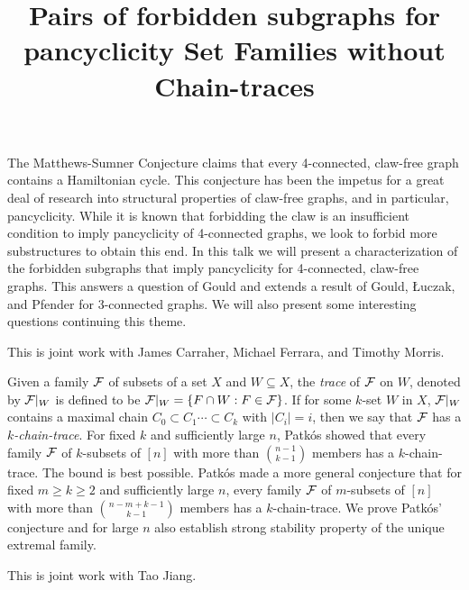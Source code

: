 \documentclass{article}
\def\cF{{\cal F}}
\begin{document}
\title{  Pairs of forbidden subgraphs for pancyclicity}
\endtitle
The Matthews-Sumner Conjecture claims that every 4-connected, claw-free graph contains a Hamiltonian cycle.  This conjecture has been the impetus for a great deal of research into structural properties of claw-free graphs, and in particular, pancyclicity.  While it is known that forbidding the claw is an insufficient condition to imply pancyclicity of 4-connected graphs, we look to forbid more substructures to obtain this end.  In this talk we will present a characterization of the forbidden subgraphs that imply pancyclicity for 4-connected, claw-free graphs.  This answers a question of Gould and extends a result of Gould, {\L}uczak, and Pfender for 3-connected graphs.  We will also present some interesting questions continuing this theme.

This is joint work with James Carraher, Michael Ferrara, and Timothy Morris.



\vspace{.25in}

\title{ Set Families without Chain-traces}
\endtitle
Given a family $\cF$ of subsets of a set $X$ and $W\subseteq X$, the {\it trace} of $\cF$ on $W$, denoted by $\cF|_W$ is defined to be  $\cF|_W=\{F\cap W: F\in \cF\}$. If for some $k$-set $W$ in $X$,
$\cF|_W$ contains a maximal chain $C_0\subset C_1\cdots \subset C_k$ with $|C_i|=i$,
then we say that $\cF$ has a {\it $k$-chain-trace}. For fixed $k$ and sufficiently large $n$, Patk\'os  showed that every family $\cF$ of $k$-subsets of $[n]$ with more than $\binom{n-1}{k-1}$ members
has a $k$-chain-trace. The bound is best possible. Patk\'os made a more general conjecture
that for fixed $m\geq k\geq 2$ and sufficiently large $n$, every family $\cF$ of $m$-subsets of $[n]$ with
more than $\binom{n-m+k-1}{k-1}$ members has a $k$-chain-trace. We prove Patk\'os' conjecture and for large $n$ also establish strong stability property of the unique
extremal family.

This is joint work with Tao Jiang.
\end{document}
